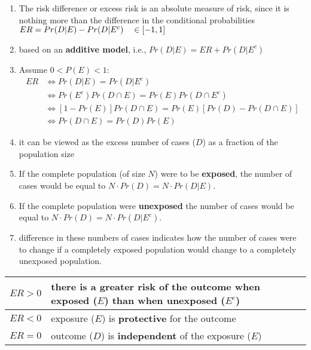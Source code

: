 \begin{enumerate}[itemsep=0.2cm]
    \item The risk difference or excess risk is an absolute measure of risk, since it is nothing more than the difference in the conditional probabilities
    $
        \hfill
        ER = Pr(D|E) - Pr(D|E^c)
        \quad \in [-1, 1]
        \hfill
    $

    \item based on an \textbf{additive model}, i.e., $Pr (D|E) = ER + Pr (D|E^c)$

    \item Assume $0 < P(E) < 1$:
    \[
    \begin{aligned}
        ER  
        &\Leftrightarrow Pr (D|E) = Pr (D|E^c) \\
        &\Leftrightarrow Pr (E^c) Pr (D \cap E) = Pr (E) Pr (D \cap E^c) \\
        &\Leftrightarrow [1 - Pr (E)] Pr (D \cap E) = Pr (E)[Pr(D) - Pr (D \cap E)] \\
        &\Leftrightarrow Pr (D \cap E) = Pr (D) Pr (E)
    \end{aligned}
    \]

    \item it can be viewed as the excess number of cases ($D$) as a fraction of the population size

    \item If the complete population (of size $N$) were to be \textbf{exposed}, the number of cases would be equal to $N \cdot Pr (D) = N \cdot Pr (D|E)$.

    \item If the complete population were \textbf{unexposed} the number of cases would be equal to $N \cdot Pr (D) = N \cdot Pr (D|E^c)$.

    \item difference in these numbers of cases indicates how the number of cases were to change if a completely exposed population would change to a completely unexposed population.
\end{enumerate}

\begin{customTableWrapper}{1.5}
\begin{table}[H]
    \centering
    \begin{tabular}{|l|p{9cm}|}
        \hline

        $ER > 0$ & there is a greater risk of the outcome when exposed ($E$) than when unexposed ($E^c$) \\
        \hline

        $ER < 0$ & exposure ($E$) is \textbf{protective} for the outcome \\
        \hline

        $ER = 0$ & outcome ($D$) is \textbf{independent} of the exposure ($E$) \\
        \hline

    \end{tabular}
\end{table}
\end{customTableWrapper}


